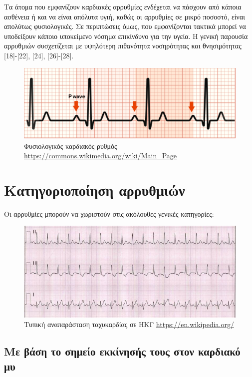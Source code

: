 Τα άτομα που εμφανίζουν καρδιακές αρρυθμίες ενδέχεται να πάσχουν από κάποια ασθένεια ή και να είναι απόλυτα υγιή, καθώς οι αρρυθμίες σε μικρό ποσοστό, είναι απολύτως φυσιολογικές. Σε περιπτώσεις όμως, που εμφανίζονται τακτικά μπορεί να υποδείξουν κάποιο υποκείμενο νόσημα επικίνδυνο για την υγεία. Η γενική παρουσία αρρυθμιών συσχετίζεται με υψηλότερη πιθανότητα νοσηρότητας και θνησιμότητας [18]-[22], [24], [26]-[28]. 
\begin{figure}[b]
	\centering
	\includegraphics[scale=0.5]{normal.png}
	\caption{Φυσιολογικός καρδιακός ρυθμός \en\protect\url{https://commons.wikimedia.org/wiki/Main_Page}}
\end{figure}
\section{Κατηγοριοποίηση αρρυθμιών}
Οι αρρυθμίες μπορούν να χωριστούν στις ακόλουθες γενικές κατηγορίες:
\begin{figure}[h]
	\centering
	\includegraphics[scale=0.3]{Sinus_Tachycardia_Unlabeled.jpg}
	\caption{Τυπική αναπαράσταση ταχυκαρδίας σε ΗΚΓ \en\protect\url{https://en.wikipedia.org/}}
\end{figure}
\subsection{Με βάση το σημείο εκκίνησής τους στον καρδιακό μυ}
